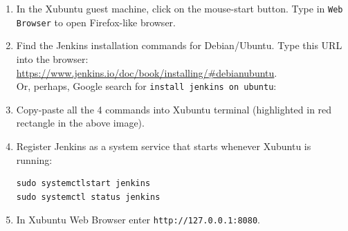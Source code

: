 \documentclass[11pt,a4paper]{article}
\begin{document}
\begin{enumerate}
\item In the Xubuntu guest machine, click on the mouse-start button. Type in {\tt Web Browser}
to open Firefox-like browser. 
\item Find the Jenkins installation commands for Debian/Ubuntu. Type this URL into the browser:
\url{https://www.jenkins.io/doc/book/installing/#debianubuntu}.\\
Or, perhaps, Google search for {\tt install jenkins on ubuntu}:\\
\item Copy-paste all the 4 commands into Xubuntu terminal (highlighted in red
rectangle in the above image).\\
\item Register Jenkins as a system service that starts whenever Xubuntu is running:
\begin{verbatim}
sudo systemctlstart jenkins
sudo systemctl status jenkins
\end{verbatim}
\item In Xubuntu Web Browser enter {\tt http://127.0.0.1:8080}.\\

\end{enumerate}
\end{document}
